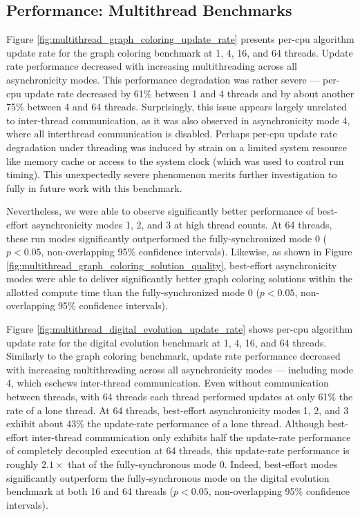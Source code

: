 \subsection{Performance: Multithread Benchmarks}



Figure \ref{fig:multithread_graph_coloring_update_rate} presents per-cpu algorithm update rate for the graph coloring benchmark at 1, 4, 16, and 64 threads.
Update rate performance decreased with increasing multithreading across all asynchronicity modes.
This performance degradation was rather severe --- per-cpu update rate decreased by 61\% between 1 and 4 threads and by about another 75\% between 4 and 64 threads.
Surprisingly, this issue appears largely unrelated to inter-thread communication, as it was also observed in asynchronicity mode 4, where all interthread communication is disabled.
Perhaps per-cpu update rate degradation under threading was induced by strain on a limited system resource like memory cache or access to the system clock (which was used to control run timing).
This unexpectedly severe phenomenon merits further investigation to fully in future work with this benchmark.

Nevertheless, we were able to observe significantly better performance of best-effort asynchronicity modes 1, 2, and 3 at high thread counts.
At 64 threads, these run modes significantly outperformed the fully-synchronized mode 0 ($p < 0.05$, non-overlapping 95\% confidence intervals).
Likewise, as shown in Figure \ref{fig:multithread_graph_coloring_solution_quality}, best-effort asynchronicity modes were able to deliver significantly better graph coloring solutions within the allotted compute time than the fully-synchronized mode 0 ($p < 0.05$, non-overlapping 95\% confidence intervals).

Figure \ref{fig:multithread_digital_evolution_update_rate} shows per-cpu algorithm update rate for the digital evolution benchmark at 1, 4, 16, and 64 threads.
Similarly to the graph coloring benchmark, update rate performance decreased with increasing multithreading across all asynchronicity modes --- including mode 4, which eschews inter-thread communication.
Even without communication between threads, with 64 threads each thread performed updates at only 61\% the rate of a lone thread.
At 64 threads, best-effort asynchronicity modes 1, 2, and 3 exhibit about 43\% the update-rate performance of a lone thread.
Although best-effort inter-thread communication only exhibits half the update-rate performance of completely decoupled execution at 64 threads, this update-rate performance is roughly $2.1\times$ that of the fully-synchronous mode 0.
Indeed, best-effort modes significantly outperform the fully-synchronous mode on the digital evolution benchmark at both 16 and 64 threads ($p < 0.05$, non-overlapping 95\% confidence intervals).
